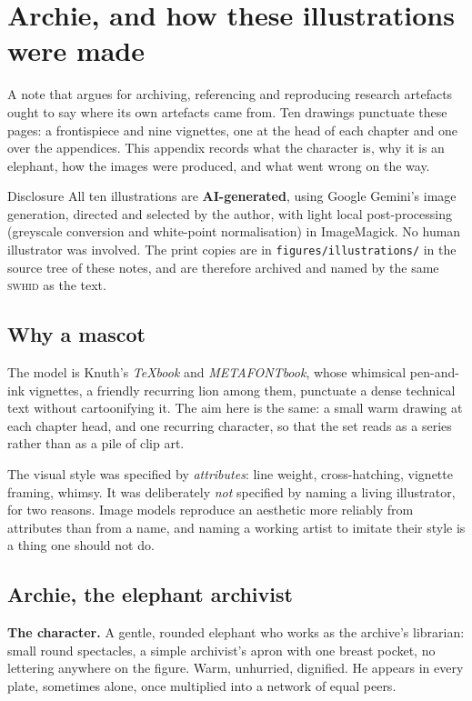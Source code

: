 \chapter{Archie, and how these illustrations were made}
\label{app:archie}

A note that argues for archiving, referencing and reproducing research artefacts ought to say
where its own artefacts came from. Ten drawings punctuate these pages: a frontispiece and nine
vignettes, one at the head of each chapter and one over the appendices. This appendix records
what the character is, why it is an elephant, how the images were produced, and what went wrong
on the way.

\begin{callout}{Disclosure}
\small All ten illustrations are \textbf{AI-generated}, using Google Gemini's image generation,
directed and selected by the author, with light local post-processing (greyscale conversion and
white-point normalisation) in ImageMagick. No human illustrator was involved. The print copies
are in \texttt{figures/illustrations/} in the source tree of these notes, and are therefore
archived and named by the same \textsc{swhid} as the text.
\end{callout}

\section{Why a mascot}

The model is Knuth's \emph{TeXbook} and \emph{METAFONTbook}, whose whimsical pen-and-ink
vignettes, a friendly recurring lion among them, punctuate a dense technical text without
cartoonifying it. The aim here is the same: a small warm drawing at each chapter head, and one
recurring character, so that the set reads as a series rather than as a pile of clip art.

The visual style was specified by \emph{attributes}: line weight, cross-hatching, vignette
framing, whimsy. It was deliberately \emph{not} specified by naming a living illustrator, for
two reasons. Image models reproduce an aesthetic more reliably from attributes than from a name,
and naming a working artist to imitate their style is a thing one should not do.

\section{Archie, the elephant archivist}

\textbf{The character.} A gentle, rounded elephant who works as the archive's librarian: small
round spectacles, a simple archivist's apron with one breast pocket, no lettering anywhere on
the figure. Warm, unhurried, dignified. He appears in every plate, sometimes alone, once
multiplied into a network of equal peers.

